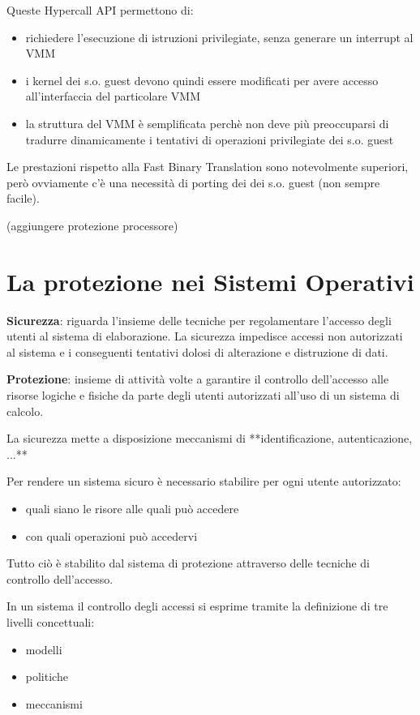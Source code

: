 \documentclass{article}
\begin{document}
Queste Hypercall API permettono di:
\begin{itemize}
    \item richiedere l'esecuzione di istruzioni privilegiate, senza generare un interrupt al VMM
    \item i kernel dei s.o. guest devono quindi essere modificati per avere accesso all'interfaccia del particolare VMM
    \item la struttura del VMM è semplificata perchè non deve più preoccuparsi di tradurre dinamicamente i tentativi di operazioni privilegiate dei s.o. guest
\end{itemize}

Le prestazioni rispetto alla Fast Binary Translation sono notevolmente superiori, però ovviamente c'è una necessità di porting dei dei s.o. guest (non sempre facile).

(aggiungere protezione processore)


\newpage

\section{La protezione nei Sistemi Operativi}

\textbf{Sicurezza}: riguarda l'insieme delle tecniche per regolamentare l'accesso degli utenti al sistema di elaborazione. La sicurezza impedisce accessi
non autorizzati al sistema e i conseguenti tentativi dolosi di alterazione e distruzione di dati.

\vspace{3mm}
\textbf{Protezione}: insieme di attività volte a garantire il controllo dell'accesso alle risorse logiche e fisiche da parte degli utenti autorizzati
all'uso di un sistema di calcolo.

La sicurezza mette a disposizione meccanismi di **identificazione, autenticazione, ...**

Per rendere un sistema sicuro è necessario stabilire per ogni utente autorizzato:
\begin{itemize}
    \item quali siano le risore alle quali può accedere
    \item con quali operazioni può accedervi
\end{itemize}

Tutto ciò è stabilito dal sistema di protezione attraverso delle tecniche di controllo dell'accesso.

In un sistema il controllo degli accessi si esprime tramite la definizione di tre livelli concettuali:
\begin{itemize}
    \item modelli
    \item politiche
    \item meccanismi
\end{itemize}
\end{document}
